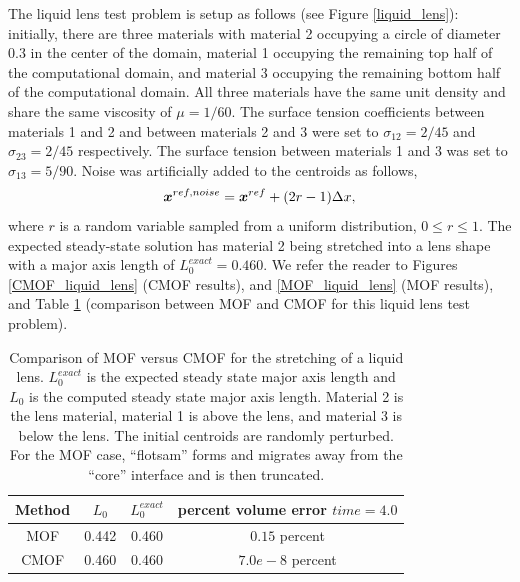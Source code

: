 \documentclass[]{article}
\newcommand{\bmx}{\mbox{\boldmath $x$\unboldmath}}
\begin{document}
The liquid lens test problem is setup as follows 
(see Figure \ref{liquid_lens}):
initially, there are three
materials with material 2 occupying a circle of diameter $0.3$ in 
the center of the domain, material
1 occupying the remaining top half of the computational domain, and 
material 3 occupying the
remaining bottom half of the computational domain. 
All three materials have the same unit density
and share the same viscosity of $\mu=1/60$. 
The surface tension coefficients between materials 1 and 2
and between materials 2 and 3 were set to $\sigma_{12}=2/45$ and
$\sigma_{23}=2/45$ respectively. The surface tension between materials
1 and 3 was set to $\sigma_{13}=5/90$.
Noise was artificially added to the centroids as follows,
\begin{eqnarray}
\bmx^{ref,noise}=\bmx^{ref}+(2r-1)\Delta x, \label{noise}
\end{eqnarray}
where $r$ is a random variable sampled from a uniform 
distribution, $0\le r\le 1$.
The expected steady-state solution has material 2 being stretched into
a lens shape with a major axis length of $L^{exact}_{0}=0.460$. 
We refer the reader to Figures \ref{CMOF_liquid_lens} (CMOF results), and
\ref{MOF_liquid_lens} (MOF results), and Table \ref{liquidlens_table}
(comparison between MOF and CMOF for this liquid lens test problem).


\begin{table}[h!]
\caption{Comparison of MOF versus CMOF for the stretching of
	a liquid lens.  $L^{exact}_{0}$ is the expected steady
	state major axis length and $L_{0}$ is the computed
	steady state major axis length.
	Material 2 is the
	lens material, material 1 is above the lens, and
	material 3 is below the lens.  
        The initial centroids are randomly perturbed.  For the 
	MOF case, ``flotsam'' forms and migrates away from the
	``core'' interface and is then truncated.
}
 \centering
\begin{tabular}{|c|c|c|c|}
\hline
Method & $L_{0}$ & $L_{0}^{exact}$ & percent volume error $time=4.0$ \\ \hline
MOF    & 0.442  & 0.460 & $0.15$ percent   \\ \hline
CMOF   & 0.460  & 0.460 & $7.0e-8$ percent \\ \hline
\end{tabular}
\label{liquidlens_table}
\end{table}
\end{document}
